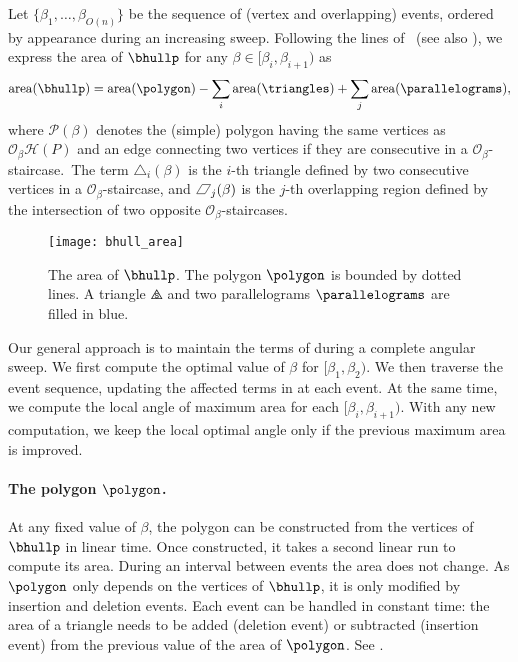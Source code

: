 \documentclass[11pt,letterpaper,english]{article}
\theoremstyle{definition}
\newcommand{\area}{\operatorname{area}}
\newcommand*{\parallelogram}[1][]{\pgfpicture\pgfsetroundjoin
    \pgftransformxslant{.6}\pgfpathrectangle{\pgfpointorigin}{\pgfpoint{.60em}{.65em}}\pgfusepath{stroke,#1}\endpgfpicture}
\begin{document}
Let $\{ \beta_1, \ldots, \beta_{O(n)} \}$ be the sequence of (vertex
and overlapping) events, ordered by appearance during an increasing
sweep. Following the lines of~\citet{bae_2009} (see also ), we express the area of
$\bhullp$ for any $\beta \in [\beta_i,\beta_{i+1})$ as
\begin{equation}
  \label{apps:area:eqn:area}
  \area(\bhullp) = \area(\polygon)
  - \sum_i \area(\triangles)
  + \sum_j \area(\parallelograms),
\end{equation}
where
 $\mathcal{P}(\beta)$ denotes the (simple) polygon having the same vertices as $\mathcal{O}_{\beta}\mathcal{H}(P)$ and an edge connecting two vertices if they are
consecutive in a $\mathcal{O}_{\beta}$-staircase.~The term $\triangle_i(\beta)$ is the $i$-th triangle defined by two consecutive vertices in a $\mathcal{O}_{\beta}$-staircase, and $\parallelogram_j(\beta)$ is the $j$-th overlapping region defined by the intersection of two opposite $\mathcal{O}_{\beta}$-staircases.


\begin{figure}[ht]
  \centering
  \begin{minipage}{0.9\textwidth}
    \centering
    \texttt{[image: bhull\_area]}
    \caption{The area of $\bhullp$. The polygon $\polygon$ is bounded
      by dotted lines. A triangle $\triangles$ and two parallelograms
      $\parallelograms$ are filled in blue.}
    \label{apps:area:fig:area}
  \end{minipage}
\end{figure}

Our general approach is to maintain the terms of
 during a complete angular sweep. We first
compute the optimal value of $\beta$ for $[\beta_1,\beta_2)$. We then
traverse the event sequence, updating the affected terms in
 at each event. At the same time, we compute
the local angle of maximum area for each $[\beta_i,\beta_{i+1})$. With
any new computation, we keep the local optimal angle only if the
previous maximum area is improved.

\paragraph{The polygon $\polygon$.}

At any fixed value of $\beta$, the polygon can be constructed from the
vertices of $\bhullp$ in linear time. Once constructed, it takes a
second linear run to compute its area. During an interval between
events the area does not change. As $\polygon$ only depends on the
vertices of $\bhullp$, it is only modified by insertion and deletion
events. Each event can be handled in constant time: the area of a
triangle needs to be added (deletion event) or subtracted (insertion
event) from the previous value of the area of $\polygon$. See
.
\end{document}
